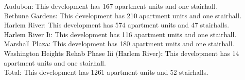 {Audubon}: This development has 167 apartment units and one stairhall.\\{Bethune Gardens}: This development has 210 apartment units and one stairhall.\\{Harlem River}: This development has 574 apartment units and 47 stairhalls.\\{Harlem River Ii}: This development has 116 apartment units and one stairhall.\\{Marshall Plaza}: This development has 180 apartment units and one stairhall.\\{Washington Heights Rehab Phase Iii (Harlem River)}: This development has 14 apartment units and one stairhall.\\{Total}: This development has 1261 apartment units and 52 stairhalls.\\